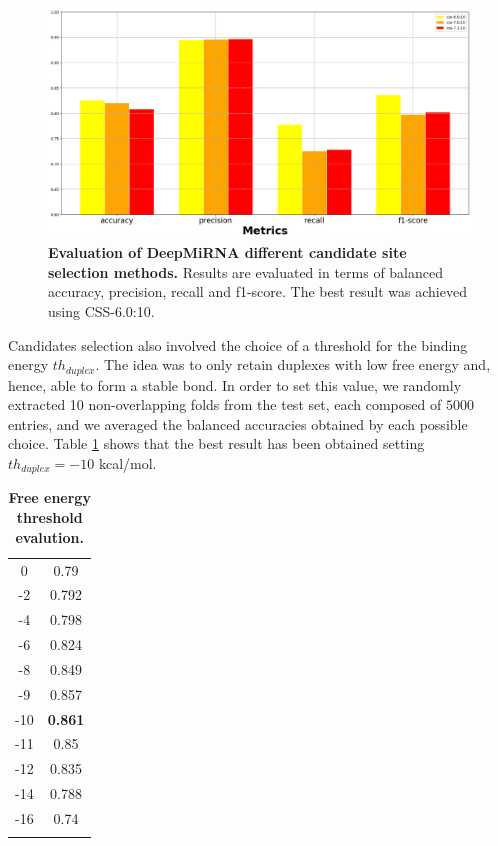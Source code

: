 \begin{figure}[hbt!]
	\centering
	\includegraphics[width=\textwidth]{Figures/cssm_evaluation}
	\caption{\textbf{Evaluation of DeepMiRNA different candidate site selection methods.} Results are evaluated in terms of balanced accuracy, precision, recall and f1-score. The best result was achieved using CSS-6.0:10.}
	\label{fig:cssm}
\end{figure}

Candidates selection also involved the choice of a threshold for the binding energy $th_{duplex}$.  The idea was to only retain duplexes with low free energy and, hence, able to form a stable bond. In order to set this value, we randomly extracted 10 non-overlapping folds from the test set, each composed of $5000$ entries, and we averaged the balanced accuracies obtained by each possible choice. Table \ref{tab:free_energy} shows that the best result has been obtained setting $th_{duplex} = -10$ kcal/mol. 

\begin{table}[h!]
	\caption{\textbf{Free energy threshold evalution.}}
	\label{tab:free_energy}
	\centering
	\begin{tabular}{c c}
		\toprule
		\tabhead{Threshold} & \tabhead{Balanced Accuracy} \\
		\midrule
		0 & 0.79 \\
		-2 & 0.792 \\
		-4 & 0.798 \\
		-6 & 0.824 \\
		-8 & 0.849 \\
		-9 & 0.857 \\
		-10 & \textbf{0.861} \\
		-11 & 0.85 \\
		-12 & 0.835 \\
		-14 & 0.788 \\
		-16 & 0.74 \\
		\bottomrule \\
	\end{tabular}
\end{table}

